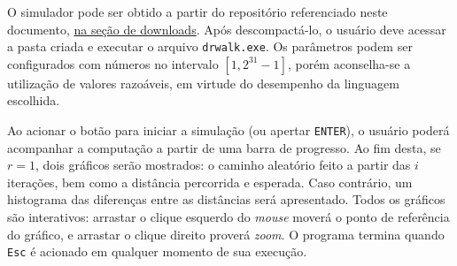\documentclass{sftex/sftex}
\begin{document}
O simulador pode ser obtido a partir do repositório referenciado neste
documento, \href{https://github.com/zambonin/UFSC-INE5425/releases}{na seção de
downloads}. Após descompactá-lo, o usuário deve acessar a pasta criada e
executar o arquivo \texttt{drwalk.exe}. Os parâmetros podem ser configurados
com números no intervalo $[1, 2^{31} - 1]$, porém aconselha-se a utilização de
valores razoáveis, em virtude do desempenho da linguagem escolhida.
\vspace{2mm}

\noindent Ao acionar o botão para iniciar a simulação (ou apertar
\texttt{ENTER}), o usuário poderá acompanhar a computação a partir de uma
barra de progresso. Ao fim desta, se $r = 1$, dois gráficos serão mostrados:
o caminho aleatório feito a partir das $i$ iterações, bem como a distância
percorrida e esperada. Caso contrário, um histograma das diferenças entre as
distâncias será apresentado. Todos os gráficos são interativos: arrastar o
clique esquerdo do \emph{mouse} moverá o ponto de referência do gráfico, e
arrastar o clique direito proverá \emph{zoom}. O programa termina quando
\texttt{Esc} é acionado em qualquer momento de sua execução.
\end{document}
